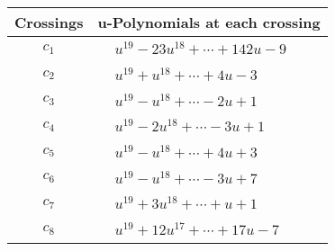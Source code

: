 \documentclass[1p]{elsarticle_modified}
\theoremstyle{definition}
\begin{document}
\begin{tabular}{m{50pt}|m{274pt}}
Crossings & \hspace{64pt}u-Polynomials at each crossing \\
\hline $$\begin{aligned}c_{1}\end{aligned}$$&$\begin{aligned}
&u^{19}-23 u^{18}+\cdots+142 u-9
\end{aligned}$\\
\hline $$\begin{aligned}c_{2}\end{aligned}$$&$\begin{aligned}
&u^{19}+u^{18}+\cdots+4 u-3
\end{aligned}$\\
\hline $$\begin{aligned}c_{3}\end{aligned}$$&$\begin{aligned}
&u^{19}- u^{18}+\cdots-2 u+1
\end{aligned}$\\
\hline $$\begin{aligned}c_{4}\end{aligned}$$&$\begin{aligned}
&u^{19}-2 u^{18}+\cdots-3 u+1
\end{aligned}$\\
\hline $$\begin{aligned}c_{5}\end{aligned}$$&$\begin{aligned}
&u^{19}- u^{18}+\cdots+4 u+3
\end{aligned}$\\
\hline $$\begin{aligned}c_{6}\end{aligned}$$&$\begin{aligned}
&u^{19}- u^{18}+\cdots-3 u+7
\end{aligned}$\\
\hline $$\begin{aligned}c_{7}\end{aligned}$$&$\begin{aligned}
&u^{19}+3 u^{18}+\cdots+u+1
\end{aligned}$\\
\hline $$\begin{aligned}c_{8}\end{aligned}$$&$\begin{aligned}
&u^{19}+12 u^{17}+\cdots+17 u-7
\end{aligned}$\\

\end{tabular}
\end{document}
